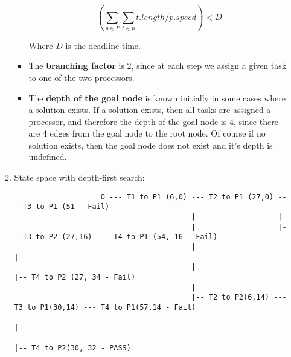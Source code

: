 \documentclass{article}
\begin{document}
\begin{enumerate}
\begin{enumerate}
\begin{itemize}
					$$(\sum_{p \in P}\sum_{t \in p}t.length/p.speed) < D$$
					
					Where $D$ is the deadline time.
					
					\item The \textbf{branching factor} is 2, since at each step we assign a given task to one of the two processors.
					
					\item The \textbf{depth of the goal node} is known initially in some cases where a solution exists.  If a solution exists, then all tasks are assigned a processor, and therefore the depth of the goal node is 4, since there are 4 edges from the goal node to the root node.  Of course if no solution exists, then the goal node does not exist and it's depth is undefined.
				\end{itemize}
			
				\item State space with depth-first search:
				
				\begin{verbatim}
					O --- T1 to P1 (6,0) --- T2 to P1 (27,0) --- T3 to P1 (51 - Fail)
					                     |                   |
					                     |                   |-- T3 to P2 (27,16) --- T4 to P1 (54, 16 - Fail)
					                     |                                        |
					                     |                                        |-- T4 to P2 (27, 34 - Fail)
					                     |
					                     |-- T2 to P2(6,14) --- T3 to P1(30,14) --- T4 to P1(57,14 - Fail)
					                                                            |
					                                                            |-- T4 to P2(30, 32 - PASS)
				\end{verbatim}
			\end{enumerate}
		
	\end{enumerate}
\end{document}
